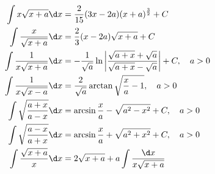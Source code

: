 \begin{example}[根式]
	\[ \begin{aligned}
			\int x \sqrt{x+a} \d x           & = \frac{2}{15} (3x - 2a) (x+a)^{\frac{3}{2}} + C                                                                   \\
			\int \frac{x}{\sqrt{x+a}} \d x   & = \frac{2}{3} (x - 2a) \sqrt{x+a} + C                                                                              \\
			\int \frac{1}{x\sqrt{x+a}} \d x  & = -\frac{1}{\sqrt{a}} \ln \left| \frac{\sqrt{a + x} + \sqrt{a}}{\sqrt{a + x} - \sqrt{a}} \right| + C , \quad a > 0 \\
			\int \frac{1}{x\sqrt{x-a}} \d x  & = \frac{2}{\sqrt{a}}\arctan \sqrt{\frac{x}{a}-1}, \quad a > 0                                                      \\
			\int \sqrt{\frac{a+x}{a-x}} \d x & = \arcsin \frac{x}{a} - \sqrt{a^2 - x^2} + C, \quad a > 0                                                          \\
			\int \sqrt{\frac{a-x}{a+x}} \d x & = \arcsin \frac{x}{a} + \sqrt{a^2 + x^2} + C, \quad a > 0                                                          \\
			\int \frac{\sqrt{x+a}}{x} \d x   & = 2 \sqrt{x+a} + a \int \frac{\d x}{x \sqrt{x+a}}
		\end{aligned} \]
\end{example}
